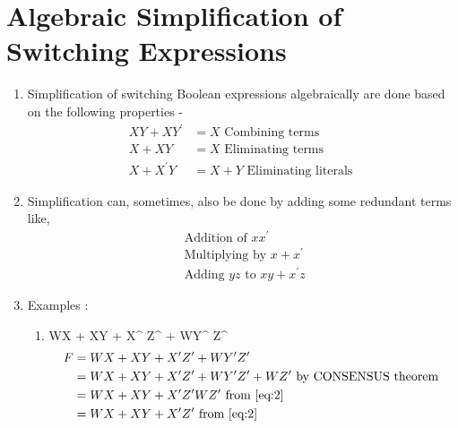 \section{\textbf{Algebraic Simplification of Switching Expressions}}

\begin{enumerate}[label=\textbf{\textdagger}]
\item Simplification of switching Boolean expressions algebraically are done based on the following properties - \\
\begin{align}
	XY + XY^{\prime} &= X  \text{ Combining terms } \label{eq:1}\\
	X + XY &= X \text{ Eliminating terms } \label{eq:2}\\
	X + X^{\prime} Y &= X + Y \text{ Eliminating literals } \label{eq:3}
\end{align}
\item Simplification can, sometimes, also be done by adding some redundant terms like, 
\begin{align}
	\text{ Addition of } xx^{\prime} \label{eq:4}\\
	\text{ Multiplying by } x + x^{\prime} \label{eq:5}\\
	\text{ Adding } yz \text{ to } xy + x^{\prime} z \label{eq:6}
\end{align}
\item Examples :
	\begin{enumerate}
		\item WX + XY + X^{\prime} Z^{\prime} + WY^{\prime} Z^{\prime} \\
			\begin{align}
				F &= WX + XY + X^{\prime} Z^{\prime} + WY^{\prime} Z^{\prime} \\
				&= WX + XY + X^{\prime} Z^{\prime} + WY^{\prime} Z^{\prime} + WZ^{\prime} \text{ by CONSENSUS theorem } \\
				&= WX + XY + X^{\prime} Z^{\prime} WZ^{\prime} \text{ from  } \eqref{eq:2} \\
				&= WX + XY + X^{\prime} Z^{\prime} \text{ from } \eqref{eq:2}
			\end{align}
	\end{enumerate}
\end{enumerate}


